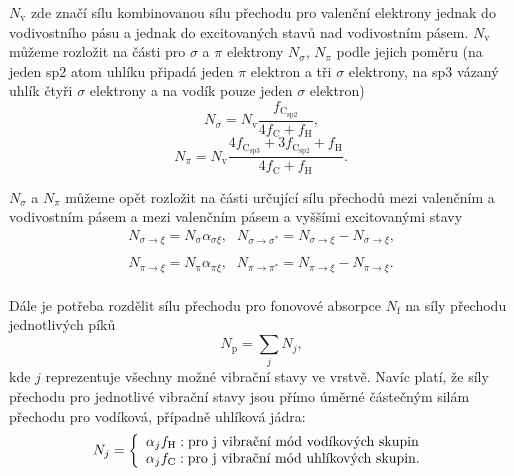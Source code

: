 $N_\mathrm{v}$ zde značí sílu kombinovanou sílu přechodu pro valenční elektrony jednak do vodivostního pásu a jednak do excitovaných stavů nad vodivostním pásem. $N_\mathrm{v}$ můžeme rozložit na části pro $\sigma$ a $\pi$ elektrony $N_\sigma$, $N_\pi$ podle jejich poměru (na jeden sp2 atom uhlíku připadá jeden $\pi$ elektron a tři $\sigma$ elektrony, na sp3 vázaný uhlík čtyři $\sigma$ elektrony a na vodík pouze jeden $\sigma$  elektron)
\begin{equation}
N_\sigma = N_\mathrm{v} \frac{f_\mathrm{C_{sp2}}}{4f_\mathrm{C} + f_\mathrm{H}}  \text{,}
\end{equation}
\begin{equation}
N_\pi = N_\mathrm{v} \frac{4f_\mathrm{C_{sp3}} + 3f_\mathrm{C_{sp2}} + f_\mathrm{H}}{4f_\mathrm{C} + f_\mathrm{H}}  \text{.}
\end{equation}

$N_\sigma$ a $N_\pi$ můžeme opět rozložit na části určující sílu přechodů mezi valenčním a vodivostním pásem a mezi valenčním pásem a vyššími excitovanými stavy
\begin{equation}
\begin{array}{lr}
N_{\sigma \rightarrow \xi} = N_\mathrm{\sigma} \alpha_{\sigma\xi} \text{,} &
N_{\sigma \rightarrow \sigma^*} = N_{\sigma \rightarrow \xi} - N_{\sigma \rightarrow \xi} \text{,} \\
\end{array}
\end{equation}
\begin{equation}
\begin{array}{lr}
N_{\pi \rightarrow \xi} = N_\mathrm{\pi} \alpha_{\pi\xi} \text{,} &
N_{\pi \rightarrow \pi^*} = N_{\pi \rightarrow \xi} - N_{\pi \rightarrow \xi} \text{.} \\
\end{array}
\end{equation}

Dále je potřeba rozdělit sílu přechodu pro fonovové absorpce $N_\mathrm{f}$ na síly přechodu jednotlivých píků
\begin{equation}
N_\mathrm{p} = \sum_j N_j \text{,}
\end{equation}
kde $j$ reprezentuje všechny možné vibrační stavy ve vrstvě. Navíc platí, že síly přechodu pro jednotlivé vibrační stavy jsou přímo úměrné částečným silám přechodu pro vodíková, případně uhlíková jádra:
\begin{equation}
N_j = 
	\left\{\begin{array}{l l} 
	\alpha_j f_\mathrm{H} : \text{pro j vibrační mód vodíkových skupin} \\
	\alpha_j f_\mathrm{C} : \text{pro j vibrační mód uhlíkových skupin.}\end{array} \right.
\end{equation}

